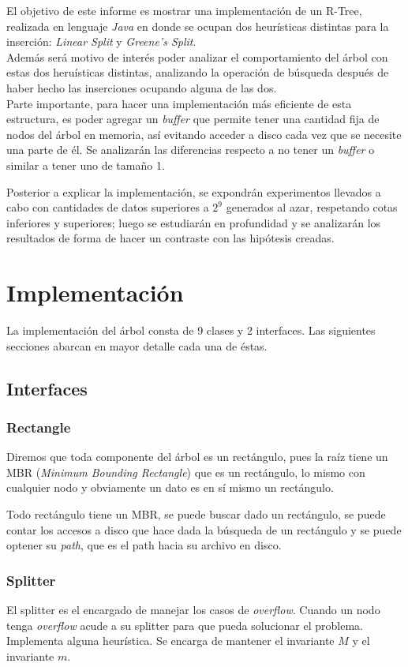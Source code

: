 \documentclass[letterpaper,11pt]{article} %
\begin{document}
El objetivo de este informe es mostrar una implementación de un R-Tree, realizada en lenguaje \textit{Java} en donde se ocupan dos heurísticas distintas para la inserción: \textit{Linear Split} y \textit{Greene's Split}. \\
Además será motivo de interés poder analizar el comportamiento del árbol con estas dos heruísticas distintas, analizando la operación de búsqueda después de haber hecho las inserciones ocupando alguna de las dos.
\\
Parte importante, para hacer una implementación más eficiente de esta estructura, es poder agregar un \textit{buffer} que permite tener una cantidad fija de nodos del árbol en memoria, así evitando acceder a disco cada vez que se necesite una parte de él. Se analizarán las diferencias respecto a no tener un \textit{buffer} o similar a tener uno de tamaño 1.

Posterior a explicar la implementación, se expondrán experimentos llevados a cabo con cantidades de datos superiores a $2^{9}$ generados al azar, respetando cotas inferiores y superiores; luego se estudiarán en profundidad y se analizarán los resultados de forma de hacer un contraste con las hipótesis creadas.

\newpage
\section{Implementación}

La implementación del árbol consta de 9 clases y 2 interfaces. Las siguientes secciones abarcan en mayor detalle cada una de éstas.

	\subsection{Interfaces}
		\subsubsection{Rectangle}
			Diremos que toda componente del árbol es un rectángulo, pues la raíz tiene un MBR (\textit{Minimum Bounding Rectangle}) que es un rectángulo, lo mismo con cualquier nodo y obviamente un dato es en sí mismo un rectángulo.
			
			Todo rectángulo tiene un MBR, se puede buscar dado un rectángulo, se puede contar los accesos a disco que hace dada la búsqueda de un rectángulo y se puede optener su \textit{path}, que es el path hacia su archivo en disco.
			
		\subsubsection{Splitter}
			El splitter es el encargado de manejar los casos de \textit{overflow}. Cuando un nodo tenga \textit{overflow} acude a su splitter para que pueda solucionar el problema. Implementa alguna heurística. Se encarga de mantener el invariante $M$ y el invariante $m$.
			
\end{document}
